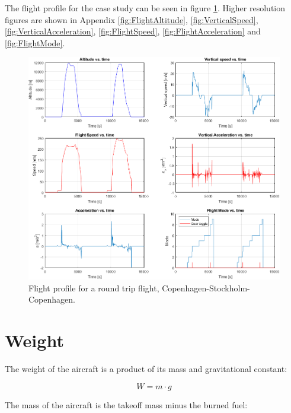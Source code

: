 \documentclass[english]{kththesis}
\begin{document}
The flight profile for the case study can be seen in figure \ref{fig:FlightProfile}.
Higher resolution figures are shown in Appendix \ref{fig:FlightAltitude}, \ref{fig:VerticalSpeed}, \ref{fig:VerticalAcceleration}, \ref{fig:FlightSpeed}, \ref{fig:FlightAcceleration} and \ref{fig:FlightMode}.
\begin{figure}[!ht]
    \centering
    \includegraphics[width=1\textwidth]{Epictures/FlightProfile.png}
    \caption{Flight profile for a round trip flight, Copenhagen-Stockholm-Copenhagen.}
    \label{fig:FlightProfile}
\end{figure}





\clearpage



\section{Weight}
\label{sec:weight}
The weight of the aircraft is a product of its mass and gravitational constant:

\begin{equation}
\label{eq:Weight}
W = m \cdot g
\end{equation}

The mass of the aircraft is the takeoff mass minus the burned fuel:
\end{document}
